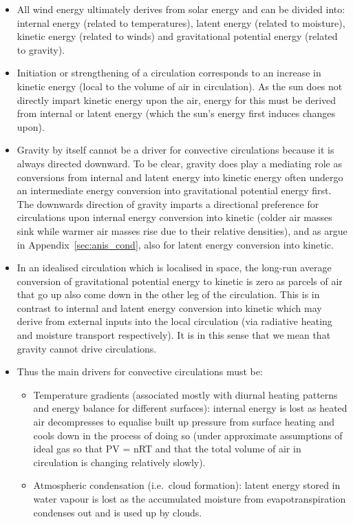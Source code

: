 \begin{itemize}
	\item All wind energy ultimately derives from solar energy and can be divided into: internal energy (related to temperatures), latent energy (related to moisture), kinetic energy (related to winds) and gravitational potential energy (related to gravity).
	\item Initiation or strengthening of a circulation corresponds to an increase in kinetic energy (local to the volume of air in circulation). As the sun does not directly impart kinetic energy upon the air, energy for this must be derived from internal or latent energy (which the sun’s energy first induces changes upon).
	\item Gravity by itself cannot be a driver for convective circulations because it is always directed downward. To be clear, gravity does play a mediating role as conversions from internal and latent energy into kinetic energy often undergo an intermediate energy conversion into gravitational potential energy first. The downwards direction of gravity imparts a directional preference for circulations upon internal energy conversion into kinetic (colder air masses sink while warmer air masses rise due to their relative densities), and as argue in Appendix~\ref{sec:anis_cond}, also for latent energy conversion into kinetic.
	\item In an idealised circulation which is localised in space, the long-run average conversion of gravitational potential energy to kinetic is zero as parcels of air that go up also come down in the other leg of the circulation. This is in contrast to internal and latent energy conversion into kinetic which may derive from external inputs into the local circulation (via radiative heating and moisture transport respectively). It is in this sense that we mean that gravity cannot drive circulations.
	\item Thus the main drivers for convective circulations must be:
	\begin{itemize}
		\item Temperature gradients (associated mostly with diurnal heating patterns and energy balance for different surfaces): internal energy is lost as heated air decompresses to equalise built up pressure from surface heating and cools down in the process of doing so (under approximate assumptions of ideal gas so that PV = nRT and that the total volume of air in circulation is changing relatively slowly).
		\item Atmospheric condensation (i.e.\ cloud formation): latent energy stored in water vapour is lost as the accumulated moisture from evapotranspiration condenses out and is used up by clouds.

\end{itemize}
\end{itemize}
